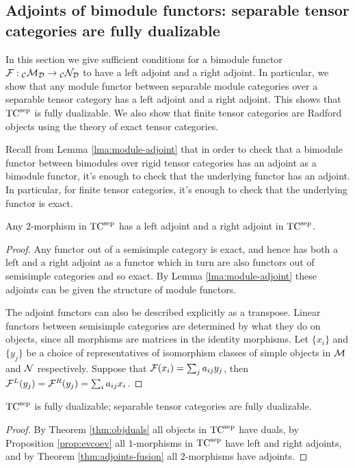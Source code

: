 \documentclass{amsart}
\begin{document}
\subsection{Adjoints of bimodule functors: separable tensor categories are fully dualizable} \label{sec:df-functors}

In this section we give sufficient conditions for a bimodule functor $\mathcal F: {}_\mathcal C \mathcal M_\mathcal D \rightarrow {}_\mathcal C \mathcal N_\mathcal D$ to have a left adjoint and a right adjoint.  In particular, we show that any module functor between separable module categories over a separable tensor category has a left adjoint and a right adjoint.  This shows that ${\mathrm{TC}^{\text{sep}}}$ is fully dualizable.  We also show that finite tensor categories are Radford objects using the theory of exact tensor categories.

Recall from Lemma \ref{lma:module-adjoint} that in order to check that a bimodule functor between bimodules over rigid tensor categories has an adjoint as a bimodule functor, it's enough to check that the underlying functor has an adjoint.  In particular, for finite tensor categories, it's enough to check that the underlying functor is exact.

\begin{theorem} \label{thm:adjoints-fusion}
Any $2$-morphism in ${\mathrm{TC}^{\text{sep}}}$ has a left adjoint and a right adjoint in ${\mathrm{TC}^{\text{sep}}}$.
\end{theorem}
\begin{proof}
Any functor out of a semisimple category is exact, and hence has both a left and a right adjoint as a functor which in turn are also functors out of semisimple categories and so exact.  By Lemma \ref{lma:module-adjoint} these adjoints can be given the structure of module functors.

The adjoint functors can also be described explicitly as a transpose.  Linear functors between semisimple categories are determined by what they do on objects, since all morphisms are matrices in the identity morphisms.  Let $\{x_i\}$ and $\{y_j\}$ be a choice of representatives of isomorphism classes of simple objects in $\mathcal M$ and $\mathcal N$ respectively.  Suppose that $\mathcal F(x_i) = \sum_j a_{ij} y_j$, then $\mathcal F^L(y_j) = \mathcal F^R(y_j) = \sum_i a_{ij} x_i$. 
\end{proof}

\begin{maintheorem}  \label{thm:TC-dualizable}
 ${\mathrm{TC}^{\text{sep}}}$ is fully dualizable; separable tensor categories are fully dualizable.
\end{maintheorem}
\begin{proof}
By Theorem \ref{thm:objduals} all objects in ${\mathrm{TC}^{\text{sep}}}$ have duals, by Proposition \ref{prop:evcoev} all $1$-morphisms in ${\mathrm{TC}^{\text{sep}}}$ have left and right adjoints, and by Theorem \ref{thm:adjoints-fusion} all $2$-morphisms have adjoints.
\end{proof}
\end{document}
